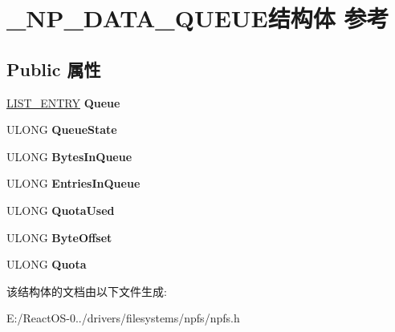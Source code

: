 \hypertarget{struct___n_p___d_a_t_a___q_u_e_u_e}{}\section{\+\_\+\+N\+P\+\_\+\+D\+A\+T\+A\+\_\+\+Q\+U\+E\+U\+E结构体 参考}
\label{struct___n_p___d_a_t_a___q_u_e_u_e}
\subsection*{Public 属性}
\begin{DoxyCompactItemize}
\item 
\mbox{\label{struct___n_p___d_a_t_a___q_u_e_u_e_aaf031d5c5d6ba6c63a2021969939cc83}} 
\hyperlink{struct___l_i_s_t___e_n_t_r_y}{L\+I\+S\+T\+\_\+\+E\+N\+T\+RY} {\bfseries Queue}
\item 
\mbox{\label{struct___n_p___d_a_t_a___q_u_e_u_e_ab3c6f6765f0448bcbe7a144329232ab7}} 
U\+L\+O\+NG {\bfseries Queue\+State}
\item 
\mbox{\label{struct___n_p___d_a_t_a___q_u_e_u_e_ad6bacafb1fb0ddae0b7090f381602c63}} 
U\+L\+O\+NG {\bfseries Bytes\+In\+Queue}
\item 
\mbox{\label{struct___n_p___d_a_t_a___q_u_e_u_e_a78f59cdded314b521400584ee2a2ed44}} 
U\+L\+O\+NG {\bfseries Entries\+In\+Queue}
\item 
\mbox{\label{struct___n_p___d_a_t_a___q_u_e_u_e_ad2bf9b5a71fccebbfd9be060f22c9f37}} 
U\+L\+O\+NG {\bfseries Quota\+Used}
\item 
\mbox{\label{struct___n_p___d_a_t_a___q_u_e_u_e_adaf2eaa1e6f9aaada4d6e6e07f109c75}} 
U\+L\+O\+NG {\bfseries Byte\+Offset}
\item 
\mbox{\label{struct___n_p___d_a_t_a___q_u_e_u_e_a41685e4232b4e739bc4e6b1d574b897a}} 
U\+L\+O\+NG {\bfseries Quota}
\end{DoxyCompactItemize}


该结构体的文档由以下文件生成\+:\begin{DoxyCompactItemize}
\item 
E\+:/\+React\+O\+S-\/0../drivers/filesystems/npfs/npfs.\+h\end{DoxyCompactItemize}
